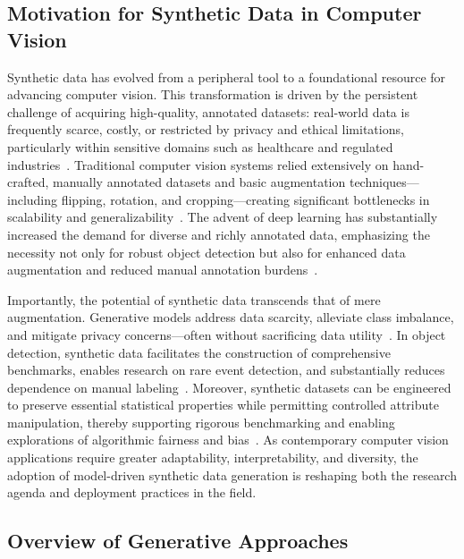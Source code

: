 \documentclass[sigconf]{acmart}
\begin{document}
\subsection{Motivation for Synthetic Data in Computer Vision}

Synthetic data has evolved from a peripheral tool to a foundational resource for advancing computer vision. This transformation is driven by the persistent challenge of acquiring high-quality, annotated datasets: real-world data is frequently scarce, costly, or restricted by privacy and ethical limitations, particularly within sensitive domains such as healthcare and regulated industries~\cite{ref12,ref21,ref22,ref33,ref35,ref43,ref87}. Traditional computer vision systems relied extensively on hand-crafted, manually annotated datasets and basic augmentation techniques—including flipping, rotation, and cropping—creating significant bottlenecks in scalability and generalizability~\cite{ref49,ref61,ref62,ref65}. The advent of deep learning has substantially increased the demand for diverse and richly annotated data, emphasizing the necessity not only for robust object detection but also for enhanced data augmentation and reduced manual annotation burdens~\cite{ref35,ref43,ref49,ref61,ref62,ref64,ref65}.

Importantly, the potential of synthetic data transcends that of mere augmentation. Generative models address data scarcity, alleviate class imbalance, and mitigate privacy concerns—often without sacrificing data utility~\cite{ref33,ref35,ref43}. In object detection, synthetic data facilitates the construction of comprehensive benchmarks, enables research on rare event detection, and substantially reduces dependence on manual labeling~\cite{ref49,ref61}. Moreover, synthetic datasets can be engineered to preserve essential statistical properties while permitting controlled attribute manipulation, thereby supporting rigorous benchmarking and enabling explorations of algorithmic fairness and bias~\cite{ref12,ref14}. As contemporary computer vision applications require greater adaptability, interpretability, and diversity, the adoption of model-driven synthetic data generation is reshaping both the research agenda and deployment practices in the field.

\subsection{Overview of Generative Approaches}
\end{document}
